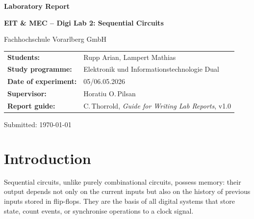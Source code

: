 \documentclass[12pt, a4paper]{article}
\newcommand{\enter}[1]{\textcolor{blue}{\textit{[#1]}}}
\begin{document}

\begin{titlepage}
  \centering
  \vspace*{3cm}
  {\LARGE\bfseries Laboratory Report\par}
  \vspace{0.5cm}
  {\large\bfseries EIT \& MEC -- Digi Lab 2: Sequential Circuits\par}
  \vspace{0.3cm}
  {\large Fachhochschule Vorarlberg GmbH\par}
  \vspace{2cm}
  \begin{tabular}{ll}
    \textbf{Students:}          & Rupp Arian, Lampert Mathias \\[4pt]
    \textbf{Study programme:}   & Elektronik und Informationstechnologie Dual \\[4pt]
    \textbf{Date of experiment:}& 05/06.05.2026 \\[4pt]
    \textbf{Supervisor:}        & Horatiu O.\,Pilsan \\[4pt]
    \textbf{Report guide:}      & C.\,Thorrold, \textit{Guide for Writing Lab Reports}, v1.0 \\
  \end{tabular}
  \vfill
  {\small Submitted: \today}
\end{titlepage}

\begin{abstract}
\enter{Write after completing all experiments -- max.\ 200 words.
Cover: objective, circuits built, key results (e.g.\ monoflop timing, counter behaviour),
main conclusion.}
\end{abstract}

\newpage
\tableofcontents
\newpage

\section{Introduction}

Sequential circuits, unlike purely combinational circuits, possess memory: their
output depends not only on the current inputs but also on the history of previous
inputs stored in flip-flops. They are the basis of all digital systems that store
state, count events, or synchronise operations to a clock signal.
\end{document}
